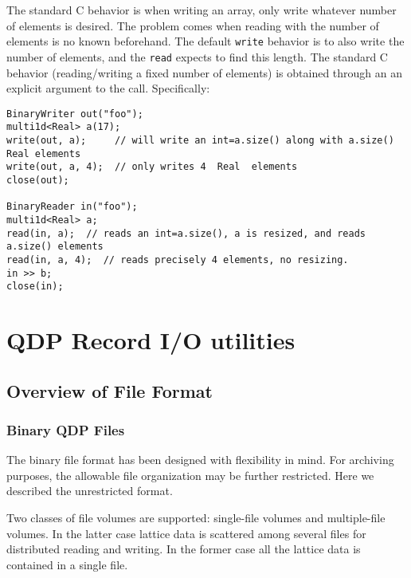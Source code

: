 \documentclass[12pt,letterpaper]{article}
\begin{document}
The standard C behavior is when writing an array, only write whatever
number of elements is desired. The problem comes when reading with the
number of elements is no known beforehand. The default \verb|write| behavior
is to also write the number of elements, and the \verb|read| expects
to find this length. The standard C behavior (reading/writing a fixed
number of elements) is obtained through an an explicit argument to the call.
Specifically:
%
\begin{small}
\begin{verbatim}
BinaryWriter out("foo");
multi1d<Real> a(17);
write(out, a);     // will write an int=a.size() along with a.size() Real elements
write(out, a, 4);  // only writes 4  Real  elements 
close(out);

BinaryReader in("foo");
multi1d<Real> a;
read(in, a);  // reads an int=a.size(), a is resized, and reads a.size() elements
read(in, a, 4);  // reads precisely 4 elements, no resizing.
in >> b;
close(in);
\end{verbatim}
\end{small}



\newpage

\section{QDP Record I/O utilities}
\label{sec:qio}

\subsection{Overview of File Format}
\label{sec.fileformat}

\subsubsection{Binary QDP Files}

The binary file format has been designed with flexibility in mind. For
archiving purposes, the allowable file organization may be further
restricted.  Here we described the unrestricted format.

Two classes of file volumes are supported: single-file volumes and
multiple-file volumes.  In the latter case lattice data is scattered
among several files for distributed reading and writing.  In the
former case all the lattice data is contained in a single file.
\end{document}
